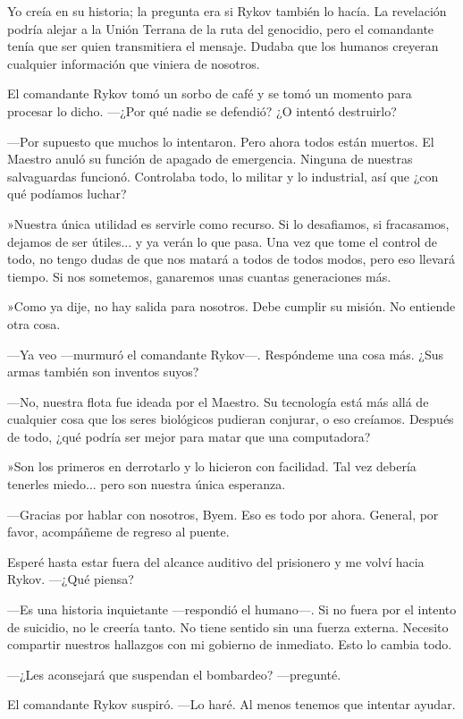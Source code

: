 Yo creía en su historia; la pregunta era si Rykov también lo hacía. La revelación podría alejar a la Unión Terrana de la ruta del genocidio, pero el comandante tenía que ser quien transmitiera el mensaje. Dudaba que los humanos creyeran cualquier información que viniera de nosotros.

El comandante Rykov tomó un sorbo de café y se tomó un momento para procesar lo dicho. —¿Por qué nadie se defendió? ¿O intentó destruirlo?

—Por supuesto que muchos lo intentaron. Pero ahora todos están muertos. El Maestro anuló su función de apagado de emergencia. Ninguna de nuestras salvaguardas funcionó. Controlaba todo, lo militar y lo industrial, así que ¿con qué podíamos luchar?

»Nuestra única utilidad es servirle como recurso. Si lo desafiamos, si fracasamos, dejamos de ser útiles... y ya verán lo que pasa. Una vez que tome el control de todo, no tengo dudas de que nos matará a todos de todos modos, pero eso llevará tiempo. Si nos sometemos, ganaremos unas cuantas generaciones más.

»Como ya dije, no hay salida para nosotros. Debe cumplir su misión. No entiende otra cosa.

—Ya veo —murmuró el comandante Rykov—. Respóndeme una cosa más. ¿Sus armas también son inventos suyos?

—No, nuestra flota fue ideada por el Maestro. Su tecnología está más allá de cualquier cosa que los seres biológicos pudieran conjurar, o eso creíamos. Después de todo, ¿qué podría ser mejor para matar que una computadora?

»Son los primeros en derrotarlo y lo hicieron con facilidad. Tal vez debería tenerles miedo... pero son nuestra única esperanza.

—Gracias por hablar con nosotros, Byem. Eso es todo por ahora. General, por favor, acompáñeme de regreso al puente.

Esperé hasta estar fuera del alcance auditivo del prisionero y me volví hacia Rykov. —¿Qué piensa?

—Es una historia inquietante —respondió el humano—. Si no fuera por el intento de suicidio, no le creería tanto. No tiene sentido sin una fuerza externa. Necesito compartir nuestros hallazgos con mi gobierno de inmediato. Esto lo cambia todo.

 —¿Les aconsejará que suspendan el bombardeo? —pregunté.

El comandante Rykov suspiró. —Lo haré. Al menos tenemos que intentar ayudar.

